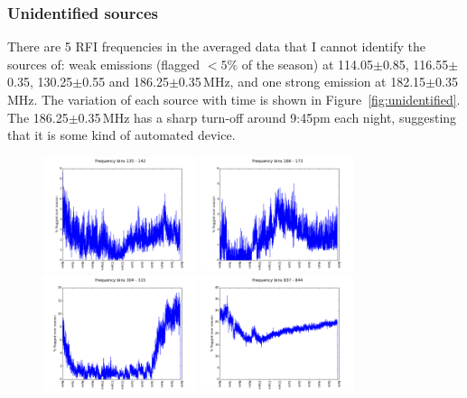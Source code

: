 \documentclass[10pt,a4paper]{article}
\begin{document}
\subsubsection{Unidentified sources}

There are 5 RFI frequencies in the averaged data that I cannot identify the sources of:  weak emissions (flagged $<5\%$ of the season) at 114.05$\pm$0.85, 116.55$\pm$0.35, 130.25$\pm$0.55 and 186.25$\pm$0.35\,MHz, and one strong emission at 182.15$\pm$0.35\,MHz. The variation of each source with time is shown in Figure~\ref{fig:unidentified}. The 186.25$\pm$0.35\,MHz has a sharp turn-off around 9:45pm each night, suggesting that it is some kind of automated device.

\begin{figure}
\centering
\includegraphics[width=0.4\textwidth]{RFI-images/FB_135_142.png}
\includegraphics[width=0.4\textwidth]{RFI-images/FB_166_173.png}
\includegraphics[width=0.4\textwidth]{RFI-images/FB_304_315.png}
\includegraphics[width=0.4\textwidth]{RFI-images/FB_837_844.png}

\end{figure}
\end{document}
